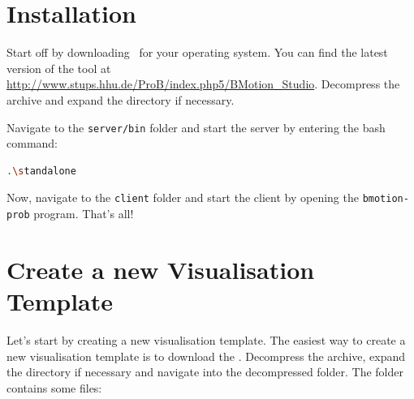 \section{Installation}
\label{installation}

Start off by downloading \bms~for your operating system. 
You can find the latest version of the tool at \url{http://www.stups.hhu.de/ProB/index.php5/BMotion_Studio}.
Decompress the archive and expand the directory if necessary. 


Navigate to the \texttt{server/bin} folder and start the server by entering the bash command:

\begin{lstlisting}[language=bash]
.\standalone
\end{lstlisting}


Now, navigate to the \texttt{client} folder and start the client by opening the \texttt{bmotion-prob} program.
That's all! 


\section{Create a new Visualisation Template}
\label{vis_template}

Let's start by creating a new visualisation template.
The easiest way to create a new visualisation template is to download the .
Decompress the archive, expand the directory if necessary and navigate into the decompressed folder.
The folder contains some files:


